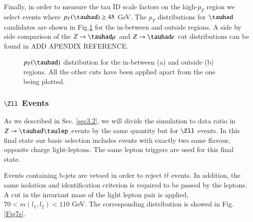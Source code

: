 Finally, in order to measure the tau ID scale factors on the high-$p_T$ region we select events where $p_T(\tauhad)\geq 45$ GeV. The $p_T$ distributions for $\tauhad$ candidates are shown in Fig.\ref{Fig6} for the in-between and outside regions. A side by side comparison of the $Z\to\tauhad\mu$ and $Z\to\tauhad e$ cut distributions can be found in ADD APENDIX REFERENCE.
\begin{figure}[htbp]
	\centering
	\hfill
	\caption{$p_T(\tauhad)$ distribution for the in-between (a) and outside (b) regions. All the other cuts have been applied apart from the one being plotted.}
	\label{Fig6}
\end{figure} 
\subsubsection{$\Zll$ Events}\label{sec3.3.2}
As we described in Sec. \ref{sec3.2}, we will divide the simulation to data ratio in $Z\to\tauhad\taulep$ events by the same quantity but for $\Zll$ events. In this final state our basic selection includes events with exactly two same flavour, opposite charge light-leptons. The same lepton triggers are used for this final state.

Events containing b-jets are vetoed in order to reject $t\bar{t}$ events. In addition, the same isolation and identification criterion is required to be passed by the leptons. A cut in the invariant mass of the light lepton pair is applied, $70<m(l_1,l_2)<110$ GeV. The corresponding distribution is showed in Fig. \ref{Fig7s}.

